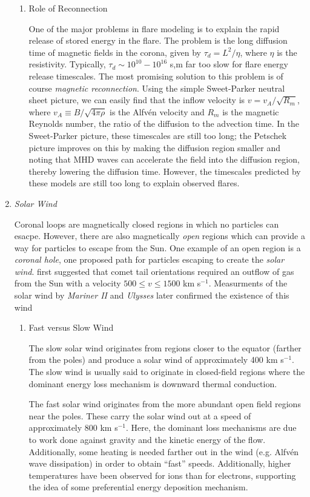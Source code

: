 \begin{enumerate}
\begin{enumerate}
				\item{Role of Reconnection}
				\par One of the major problems in flare modeling is to explain the rapid release of stored energy in the flare. The problem is the long diffusion time of magnetic fields in the corona, given by $\tau_d=L^2/\eta$, where $\eta$ is the resistivity. Typically, $\tau_d\sim10^{10}-10^{16}$ s,m far too slow for flare energy release timescales. The most promising solution to this problem is of course \textit{magnetic reconnection}. Using the simple Sweet-Parker neutral sheet picture, we can easily find that the inflow velocity is $v=v_A/\sqrt{R_m}$, where $v_A\equiv B/\sqrt{4\pi\rho}$ is the Alfv\'en velocity and $R_m$ is the magnetic Reynolds number, the ratio of the diffusion to the advection time. In the Sweet-Parker picture, these timescales are still too long; the Petschek picture improves on this by making the diffusion region smaller and noting that MHD waves can accelerate the field into the diffusion region, thereby lowering the diffusion time. However, the timescales predicted by these models are still too long to explain observed flares. 
			\end{enumerate}
			\item{\em Solar Wind}
			\par Coronal loops are magnetically closed regions in which no particles can esacpe. However, there are also magnetically \textit{open} regions which can provide a way for particles to escape from the Sun. One example of an open region is a \textit{coronal hole}, one proposed path for particles escaping to create the \textit{solar wind}. \citet{biermann_kometenschweife_1951} first suggested that comet tail orientations required an outflow of gas from the Sun with a velocity $500\le v\le 1500$ km s$^{-1}$. Measurments of the solar wind by \textit{Mariner II} and \textit{Ulysses} later confirmed the existence of this wind
			\begin{enumerate}
				\item{Fast versus Slow Wind}
				\par The slow solar wind originates from regions closer to the equator (farther from the poles) and produce a solar wind of approximately 400 km s$^{-1}$. The slow wind is usually said to originate in closed-field regions where the dominant energy loss mechanism is downward thermal conduction. 
				\par The fast solar wind originates from the more abundant open field regions near the poles. These carry the solar wind out at a speed of approximately 800 km s$^{-1}$. Here, the dominant loss mechanisms are due to work done against gravity and the kinetic energy of the flow. Additionally, some heating is needed farther out in the wind (e.g. Alfv\'en wave dissipation) in order to obtain ``fast'' speeds. Additionally, higher temperatures have been observed for ions than for electrons, supporting the idea of some preferential energy deposition mechanism.

\end{enumerate}
\end{enumerate}
